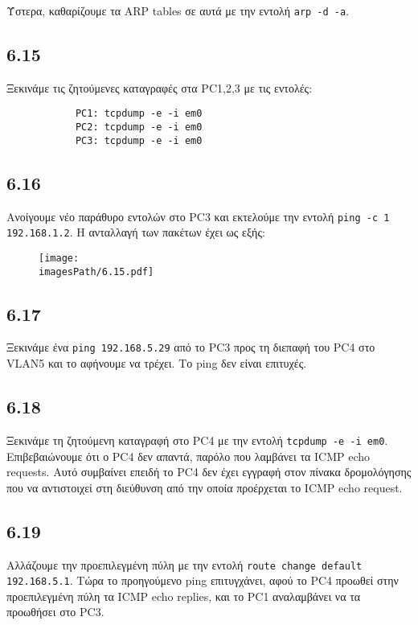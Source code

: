 \documentclass[a4paper, 12pt]{article}
\newcommand{\imagesPath}{.}
\begin{document}
		Ύστερα, καθαρίζουμε τα ARP tables σε αυτά με την εντολή \verb|arp -d -a|.
	
	\subsection*{6.15}
		Ξεκινάμε τις ζητούμενες καταγραφές στα PC1,2,3 με τις εντολές:
		
		\begin{verbatim}
			PC1: tcpdump -e -i em0
			PC2: tcpdump -e -i em0
			PC3: tcpdump -e -i em0
		\end{verbatim}

	\subsection*{6.16}
		Ανοίγουμε νέο παράθυρο εντολών στο PC3 και εκτελούμε την εντολή \verb|ping -c 1 192.168.1.2|. Η ανταλλαγή των πακέτων έχει ως εξής:
		
		\begin{figure}[H]
			\texttt{[image: \\imagesPath/6.15.pdf]}
		\end{figure}


	\subsection*{6.17}
		Ξεκινάμε ένα \verb|ping 192.168.5.29| από το PC3 προς τη διεπαφή του PC4 στο VLAN5 και το αφήνουμε να τρέχει. Το ping δεν είναι επιτυχές.

	\subsection*{6.18} 
		Ξεκινάμε τη ζητούμενη καταγραφή στο PC4 με την εντολή \verb|tcpdump -e -i em0|. Επιβεβαιώνουμε ότι ο PC4 δεν απαντά, παρόλο που λαμβάνει τα ICMP echo requests. Αυτό συμβαίνει επειδή το PC4 δεν έχει εγγραφή στον πίνακα δρομολόγησης που να αντιστοιχεί στη διεύθυνση από την οποία προέρχεται το ICMP echo request.

	\subsection*{6.19}
		Αλλάζουμε την προεπιλεγμένη πύλη με την εντολή \verb|route change default 192.168.5.1|. Τώρα το προηγούμενο ping επιτυγχάνει, αφού το PC4 προωθεί στην προεπιλεγμένη πύλη τα ICMP echo replies, και το PC1 αναλαμβάνει να τα προωθήσει στο PC3. 
\end{document}
